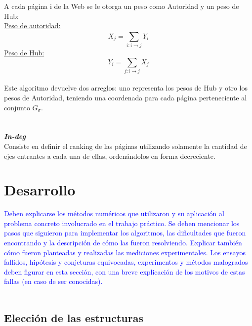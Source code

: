 \documentclass[a4paper]{article}
\begin{document}
\indent A cada p\'agina i de la Web se le otorga un peso como Autoridad y un peso de Hub: \\
\indent \underline{Peso de autoridad:}
\[
	X_j = \sum_{i: i\rightarrow j}^{} Y_i
\]
\indent \underline{Peso de Hub:}
\[
Y_i = \sum_{j: i\rightarrow j} X_j
\]
\\
Este algoritmo devuelve dos arreglos: uno representa los pesos de Hub y otro los pesos de Autoridad, teniendo una coordenada para cada p\'agina perteneciente al conjunto $G_\sigma$.\\
\\
\\
\indent \indent \emph{\textbf{In-deg}} \\
\indent Consiste en definir el ranking de las p\'aginas utilizando solamente la cantidad de ejes entrantes a cada una de ellas, orden\'andolos en forma decreciente.\\

\newpage
\section{Desarrollo}
\textcolor{blue}{
Deben explicarse los m\'etodos num\'ericos que utilizaron y su aplicaci\'on al problema
concreto involucrado en el trabajo pr\'actico. Se deben mencionar los pasos que siguieron
para implementar los algoritmos, las dificultades que fueron encontrando y la
descripci\'on de c\'omo las fueron resolviendo. Explicar tambi\'en c\'omo fueron planteadas
y realizadas las mediciones experimentales. Los ensayos fallidos, hip\'otesis y conjeturas
equivocadas, experimentos y m\'etodos malogrados deben figurar en esta secci\'on, con
una breve explicaci\'on de los motivos de estas fallas (en caso de ser conocidas).\\
}
\\
\subsection{Elecci\'on de las estructuras}
\end{document}
